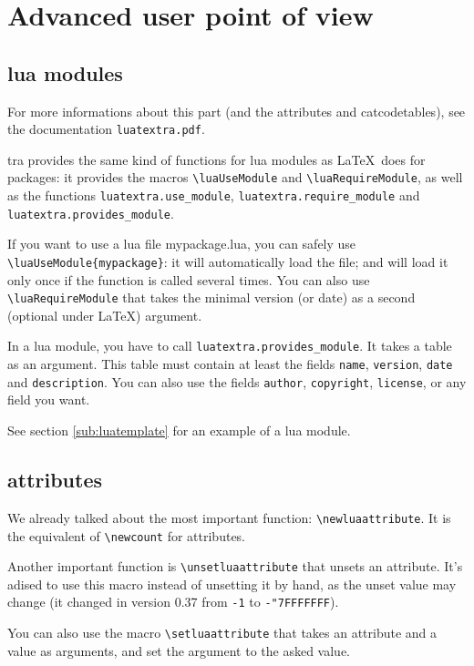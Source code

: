 \documentclass{article}
\newcommand\code{\texttt}
\begin{document}
\section{Advanced user point of view}

\subsection{lua modules}

For more informations about this part (and the attributes and catcodetables),
see the documentation \code{luatextra.pdf}.

\LuaTeX tra provides the same kind of functions for lua modules as \LaTeX\
does for packages: it provides the macros \verb+\luaUseModule+ and
\verb+\luaRequireModule+, as well as the functions
\code{luatextra.use\_module}, \code{luatextra.require\_module} and
\code{luatextra.provides\_module}.

If you want to use a lua file mypackage.lua, you can safely use
\verb+\luaUseModule{mypackage}+: it will automatically load the
file; and will load it only once if the function is called several times. You
can also use \verb+\luaRequireModule+ that takes the minimal version
(or date) as a second (optional under \LaTeX ) argument.

In a lua module, you have to call \code{luatextra.provides\_module}. It
takes a table as an argument. This table must contain at least the fields
\code{name}, \code{version}, \code{date} and \code{description}. You
can also use the fields \code{author}, \code{copyright}, \code{license},
or any field you want.

See section \ref{sub:luatemplate} for an example of a lua module.

\subsection{attributes}

We already talked about the most important function:
\verb+\newluaattribute+. It is the equivalent of
\verb+\newcount+ for attributes.

Another important function is \verb+\unsetluaattribute+ that unsets
an attribute. It's adised to use this macro instead of unsetting it by hand,
as the unset value may change (it changed in version 0.37 from \code{-1} to
\code{-"7FFFFFFF}).

You can also use the macro \verb+\setluaattribute+ that takes an
attribute and a value as arguments, and set the argument to the asked value.
\end{document}
